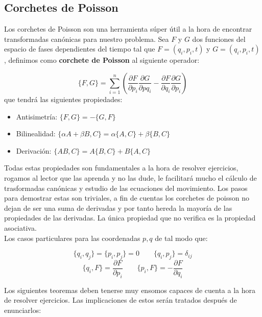 \documentclass[12pt,a4paper]{article}
\numberwithin{equation}{section}
\numberwithin{figure}{section}
\newcommand{\parentesis}[1]{\left( #1  \right)}
\newcommand{\parciales}[2]{\frac{\partial #1}{\partial #2}}
\begin{document}
\subsection{Corchetes de Poisson}

Los corchetes de Poisson son una herramienta súper útil a la hora de encontrar transformadas canónicas para nuestro problema. Sea $F$ y $G$ dos funciones del espacio de fases dependientes del tiempo tal que $F=(q_i,p_i,t)$ y $G=(q_i,p_i,t)$, definimos como \textbf{corchete de Poisson} al siguiente operador:

\begin{equation}
\{ F,G \} = \sum_{i=1}^n \parentesis{\parciales{F	}{p_i}\parciales{G}{p
q_i}-\parciales{F}{q_i}\parciales{G}{p_i}}
\end{equation}
que tendrá las siguientes propiedades:

\begin{itemize}
\item Antisimetría: $\{ F,G \} = - \{ G,F \}$
\item Bilinealidad: $\{ \alpha A + \beta B, C \} = \alpha \{A,C\} + \beta \{B,C\}$
\item Derivación: $\{AB,C \} = A\{ B,C \}+ B \{ A,C \}$
\end{itemize}

Todas estas propiedades son fundamentales a la hora de resolver ejercicios, rogamos al lector que las aprenda y no las dude, le facilitará mucho el cálculo de trasformadas canónicas y estudio de las ecuaciones del movimiento. Los pasos para demostrar estas son triviales, a fin de cuentas los corchetes de poisson no dejan de ser una suma de derivadas y por tanto hereda la mayoría de las propiedades de las derivadas. La única propiedad que no verifica es la propiedad asociativa. \\

Los casos particulares para las coordenadas $p,q$ de tal modo que:

\begin{equation}
\{ q_i, q_ j \} = \{ p_i , p_j \} = 0 \quad \quad \{q_i,p_j\} = \delta_{ij}
\end{equation}
\begin{equation}
\{ q_i, F \} = \parciales{F}{p_i} \quad \quad \{ p_i, F \} = - \parciales{F}{q_i}
\end{equation}

Los siguientes teoremas deben tenerse muy ensomos capaces de  cuenta a la hora de resolver ejercicios. Las implicaciones de estos serán tratados después de enunciarlos:
\end{document}
